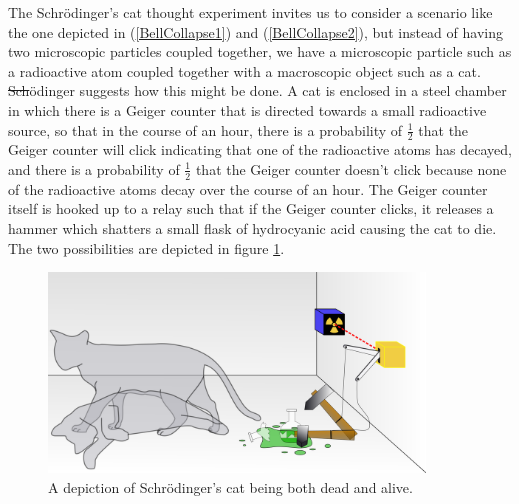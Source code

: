 \documentclass[12pt]{report}
\providecommand{\DIFadd}[1]{{\protect\color{blue}\uwave{#1}}} %
\providecommand{\DIFdel}[1]{{\protect\color{red}\sout{#1}}}                      %
\providecommand{\DIFaddbegin}{} %
\providecommand{\DIFaddend}{} %
\providecommand{\DIFdelbegin}{} %
\providecommand{\DIFdelend}{} %
\providecommand{\DIFaddbeginFL}{} %
\providecommand{\DIFaddendFL}{} %
\providecommand{\DIFdelbeginFL}{} %
\providecommand{\DIFdelendFL}{} %
\begin{document}
The Schr\"{o}dinger's cat thought experiment invites us to consider a scenario like the one depicted in (\ref{BellCollapse1}) and (\ref{BellCollapse2}), but instead of having two microscopic particles coupled together, we have a microscopic particle such as a radioactive atom coupled together with a macroscopic object such as a cat. \DIFdelbegin \DIFdel{Sch}\DIFdelend \DIFaddbegin \DIFadd{Schr}\DIFaddend \"{o}dinger suggests how this might be done. A cat is enclosed in a steel chamber in which there is a Geiger counter that is directed towards a small radioactive source, so that in the course of an hour, there is a probability of $\frac{1}{2}$ that the Geiger counter will click indicating that one of the radioactive atoms has decayed, and there is a probability of $\frac{1}{2}$ that the Geiger counter doesn't click because none of the radioactive atoms decay over the course of an hour. The Geiger counter itself is hooked up to a relay such that if the Geiger counter clicks, it releases a hammer which shatters a small flask of hydrocyanic acid causing the cat to die. The two possibilities are depicted in figure \ref{deadlivecat}.
\begin{figure}[ht!]
    \captionsetup{justification=justified}
    \centering
    \includegraphics[width=100mm]{Chapter03/Schrodingers_cat.png}
    \DIFdelbeginFL %
\DIFdelendFL \DIFaddbeginFL \caption[Depiction of Schr\"{o}dinger's cat]{\DIFaddendFL A depiction of Schr\"{o}dinger's cat being both dead and alive.\protect\footnotemark}
    \label{deadlivecat}
    \end{figure}
\end{document}
